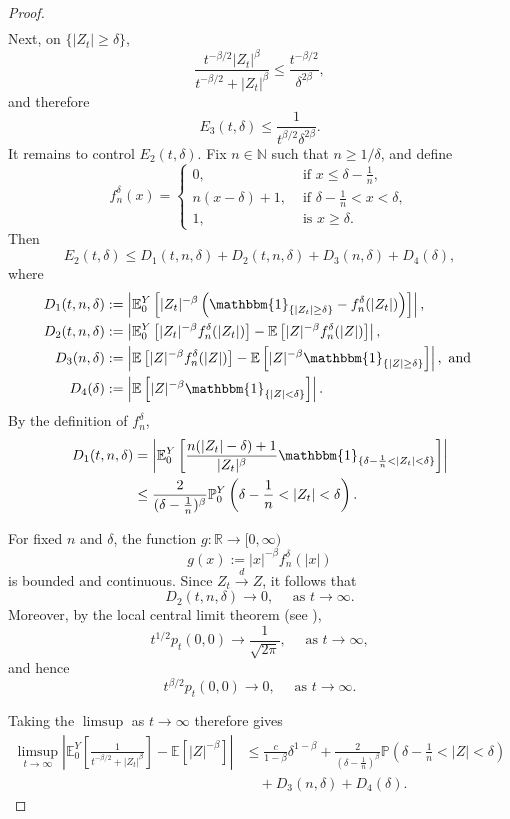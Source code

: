 \documentclass{article}[12pt]
\theoremstyle{definition}
\newcommand{\R}{\mathbb{R}}
\newcommand{\1}{\mathbbm{1}}
\begin{document}
\begin{proof}
\begin{align*}
\end{align*}
Next, on $\{|Z_t|\geq\delta\}$,
$$
\frac{t^{-\beta/2}|Z_t|^\beta}{t^{-\beta/2}+|Z_t|^\beta}\leq\frac{t^{-\beta/2}}{\delta^{2\beta}},
$$
and therefore
$$
E_3(t,\delta)\leq \frac{1}{t^{\beta/2}\delta^{2\beta}}.
$$
It remains to control $E_2(t,\delta)$. Fix $n\in\mathbb{N}$ such that $n\geq1/\delta$, and define
$$
f_n^\delta(x) = \begin{cases}
	0, & \text{ if } x\leq\delta-\frac{1}{n},\\[1mm]
	n(x-\delta)+1, & \text{ if }\delta-\frac{1}{n}<x<\delta,\\[1mm]
	1, & \text{ is } x\geq\delta.
	\end{cases}
$$
Then
$$
E_2(t,\delta) \leq D_1(t,n,\delta) + D_2(t,n,\delta) +D_3(n,\delta)+D_4(\delta),
$$
where
\begin{align*}
D_1(t,n,\delta)&:=\left|\mathbb{E}_0^Y\left[|Z_t|^{-\beta}\left(\1_{\{|Z_t|\geq\delta\}}-f_n^\delta(|Z_t|)\right)\right]\right|,\\
D_2(t,n,\delta)&:=\left|\mathbb{E}_0^Y\left[|Z_t|^{-\beta}f_n^\delta(|Z_t|)\right]-\mathbb{E}\left[|Z|^{-\beta}f_n^\delta(|Z|)\right]\right|,\\
D_3(n,\delta)&:=\left|\mathbb{E}\left[|Z|^{-\beta}f_n^\delta(|Z|)\right]-\mathbb{E}\left[|Z|^{-\beta}\1_{\{|Z|\geq\delta\}}\right]\right|, \text{ and }\\
D_4(\delta)&:=\left|\mathbb{E}\left[|Z|^{-\beta}\1_{\{|Z|<\delta\}}\right]\right|.
\end{align*}
By the definition of $f_n^\delta$,
\begin{align*}
D_1(t,n,\delta)&=\left|\mathbb{E}_0^Y\left[\frac{n(|Z_t|-\delta)+1}{|Z_t|^\beta}\1_{\{\delta-\frac1n<|Z_t|<\delta\}}\right]\right|\\
&\leq\frac{2}{(\delta-\frac1n)^\beta}\mathbb{P}_0^Y\left(\delta-\frac1n<|Z_t|<\delta\right).
\end{align*}

For fixed $n$ and $\delta$, the function $g:\R\to [0, \infty)$
$$
g(x):=|x|^{-\beta}f_n^\delta(|x|)
$$
is bounded and continuous. Since $Z_t\xrightarrow{d}Z$, it follows that
$$
D_2(t,n,\delta)\longrightarrow0,\quad \text{ as } t\to\infty.
$$
Moreover, by the local central limit theorem (see \cite[Chapter~II.7, Proposition~9]{S1964}),
$$
t^{1/2}p_t(0,0)\longrightarrow\frac{1}{\sqrt{2\pi}}, \quad \text{ as } t\to\infty,
$$
and hence
$$
t^{\beta/2}p_t(0,0)\longrightarrow0, \quad \text{ as } t\to\infty.
$$

Taking the $\limsup$ as $t\to\infty$ therefore gives
\begin{align*}
\limsup_{t\to\infty}
\left|\mathbb{E}_0^Y\left[\frac{1}{t^{-\beta/2}+|Z_t|^\beta}\right]-\mathbb{E}[|Z|^{-\beta}]\right|&\leq\frac{c}{1-\beta}\delta^{1-\beta}
+
\frac{2}{(\delta-\frac1n)^\beta}\mathbb{P}\left(\delta-\frac1n<|Z|<\delta\right)\\
&\quad+D_3(n,\delta)+D_4(\delta).
\end{align*}


\end{proof}
\end{document}
